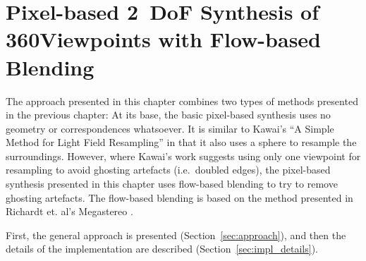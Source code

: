 \chapter{Pixel-based 2~DoF Synthesis of 360\degree Viewpoints with Flow-based Blending}\label{chap:implementation}


The approach presented in this chapter combines two types of methods presented in the previous chapter: At its base, the basic pixel-based synthesis uses no geometry or correspondences whatsoever. It is similar to Kawai's ``A Simple Method for Light Field Resampling'' \cite{simple_poster} in that it also uses a sphere to resample the surroundings. However, where Kawai's work suggests using only one viewpoint for resampling to avoid ghosting artefacts (i.e.\ doubled edges), the pixel-based synthesis  presented in this chapter uses flow-based blending to try to remove ghosting artefacts. The flow-based blending is based on the method presented in Richardt et. al's Megastereo \cite{megastereo}.

First, the general approach is presented (Section~\ref{sec:approach}), and then the details of the implementation are described (Section~\ref{sec:impl_details}).

